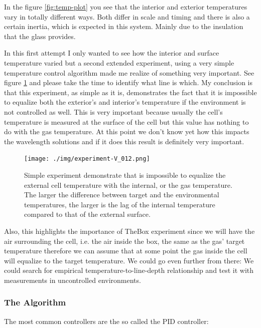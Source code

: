 \documentclass[master,       %
               twoside,        %
               BCOR10mm,       %
               ngerman,english  %
               ]{GAUBM_astro}
\begin{document}
In the figure \ref{fig:temp-plot} you see that the interior and exterior temperatures vary in totally different ways.
Both differ in scale and timing and there is also a certain inertia, which is expected in this system. Mainly due to the insulation
that the glass provides.

In this first attempt I only wanted to see how the interior and surface temperature varied but a second extended experiment, using a very simple 
temperature control algorithm made me realize of something very important. See figure \ref{fig:simple-expe} and please take the time to identify what 
line is which. My conclusion is that this experiment, as simple as it is, demonstrates the fact that it is impossible to equalize both the exterior's and interior's
temperature if the environment is not controlled as well. This is very important because usually the cell's temperature is measured at the surface of the
cell but this value has nothing to do with the gas temperature. At this point we don't know yet how this impacts the wavelength solutions and if it does
this result is definitely very important. 
\begin{figure}[h!]
 \centering
 \texttt{[image: ./img/experiment-V\_012.png]}
 \caption{Simple experiment demonstrate that is impossible to equalize the external cell temperature with the internal, or the gas temperature. The larger
 the difference between target and the environmental temperatures, the larger is the lag of the internal temperature compared to that of the external surface.}
 \label{fig:simple-expe}
\end{figure}

Also, this highlights the importance of TheBox experiment since we will have the air surrounding the cell, i.e. the air inside the box, the same as the 
gas' target temperature therefore we can assume that at some point the gas inside the cell will equalize to the target temperature. We could go even further
from there: We could search for empirical temperature-to-line-depth relationship and test it with measurements in uncontrolled environments.

\subsubsection{The Algorithm}
The most common controllers are the so called the PID controller: 
\end{document}
